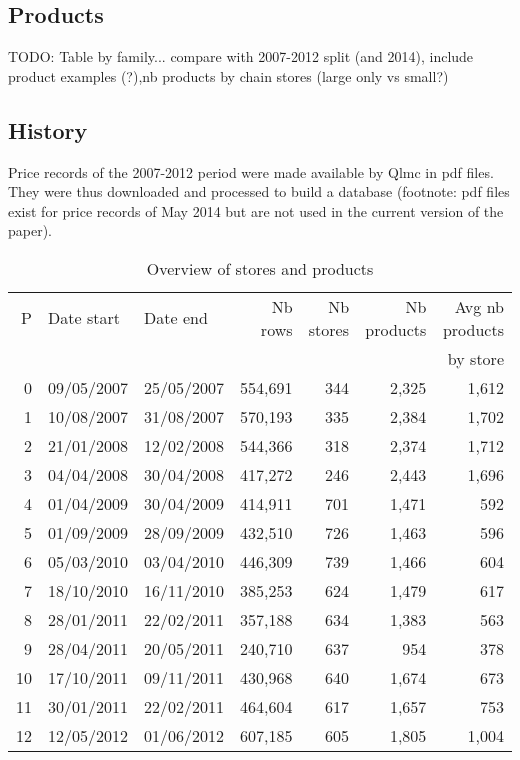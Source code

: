 \documentclass[english]{article}
\begin{document}
\subsection{Products}

TODO: Table by family... compare with 2007-2012 split (and 2014), include product examples (?),nb products by chain stores (large only vs small?)

\subsection{History}

Price records of the 2007-2012 period were made available by Qlmc in pdf files. They were thus downloaded and processed to build a database (footnote: pdf files exist for price records of May 2014 but are not used in the current version of the paper).

\begin{table}[H]
\renewcommand{\arraystretch}{0.7}%
\caption{Overview of stores and products}
\small

\begin{tabular}{rllrrrr}
\toprule
\toprule
  P &  Date start &    Date end &  Nb rows &  Nb stores &  Nb products &  Avg nb products \\
\multicolumn{6}{c}{}&  by store \\
\midrule
  0 &  09/05/2007 &  25/05/2007 &  554,691 &        344 &        2,325 &                  1,612 \\
  1 &  10/08/2007 &  31/08/2007 &  570,193 &        335 &        2,384 &                  1,702 \\
  2 &  21/01/2008 &  12/02/2008 &  544,366 &        318 &        2,374 &                  1,712 \\
  3 &  04/04/2008 &  30/04/2008 &  417,272 &        246 &        2,443 &                  1,696 \\
  4 &  01/04/2009 &  30/04/2009 &  414,911 &        701 &        1,471 &                    592 \\
  5 &  01/09/2009 &  28/09/2009 &  432,510 &        726 &        1,463 &                    596 \\
  6 &  05/03/2010 &  03/04/2010 &  446,309 &        739 &        1,466 &                    604 \\
  7 &  18/10/2010 &  16/11/2010 &  385,253 &        624 &        1,479 &                    617 \\
  8 &  28/01/2011 &  22/02/2011 &  357,188 &        634 &        1,383 &                    563 \\
  9 &  28/04/2011 &  20/05/2011 &  240,710 &        637 &          954 &                    378 \\
 10 &  17/10/2011 &  09/11/2011 &  430,968 &        640 &        1,674 &                    673 \\
 11 &  30/01/2011 &  22/02/2011 &  464,604 &        617 &        1,657 &                    753 \\
 12 &  12/05/2012 &  01/06/2012 &  607,185 &        605 &        1,805 &                  1,004 \\
\bottomrule
\end{tabular}
\end{table}
\end{document}
